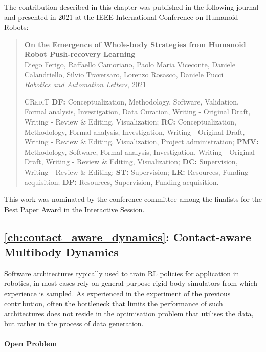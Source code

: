 The contribution described in this chapter was published in the following journal and presented in 2021 at the IEEE International Conference on Humanoid Robots:
%
\begin{quote}
    \textbf{On the Emergence of Whole-body Strategies from
Humanoid Robot Push-recovery Learning} \\
    Diego Ferigo, Raffaello Camoriano, Paolo Maria Viceconte, Daniele Calandriello, Silvio Traversaro, Lorenzo Rosasco, Daniele Pucci \\
    \textit{Robotics and Automation Letters}, 2021

    \vspace{1mm}
    \textsc{CRediT} \hspace{2mm}
    \textbf{DF:} Conceptualization, Methodology, Software, Validation, Formal analysis, Investigation, Data Curation, Writing - Original Draft, Writing - Review \& Editing, Visualization;
    \textbf{RC:} Conceptualization, Methodology, Formal analysis, Investigation, Writing - Original Draft, Writing - Review \& Editing, Visualization, Project administration;
    \textbf{PMV:} Methodology, Software, Formal analysis, Investigation, Writing - Original Draft, Writing - Review \& Editing, Visualization;
    \textbf{DC:} Supervision, Writing - Review \& Editing;
    \textbf{ST:} Supervision;
    \textbf{LR:} Resources, Funding acquisition;
    \textbf{DP:} Resources, Supervision, Funding acquisition.
\end{quote}

\noindent
This work was nominated by the conference committee among the finalists for the Best Paper Award in the Interactive Session.

\subsection{\autoref{ch:contact_aware_dynamics}: Contact-aware Multibody Dynamics}

Software architectures typically used to train \ac{RL} policies for application in robotics, in most cases rely on general-purpose rigid-body simulators from which experience is sampled.
As experienced in the experiment of the previous contribution, often the bottleneck that limits the performance of such architectures does not reside in the optimisation problem that utilises the data, but rather in the process of data generation.

\paragraph{Open Problem}

